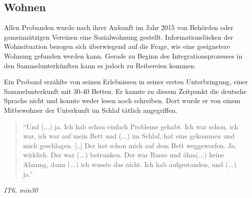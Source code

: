 \subsection{Wohnen}
Allen Probanden wurde nach ihrer Ankunft im Jahr 2015 von Behörden oder gemeinnützigen Vereinen eine Sozialwohnung gestellt. Informationslücken der Wohnsituation bezogen sich überwiegend auf die Frage, wie eine geeignetere Wohnung gefunden werden kann. Gerade zu Beginn des Integrationsprozesses in den Sammelunterkünften kann es jedoch zu Reibereien kommen. 

Ein Proband erzählte von seinen Erlebnissen in seiner ersten Unterbringung, einer Sammelunterkunft mit 30-40 Betten. Er kannte zu diesem Zeitpunkt die deutsche Sprache nicht und konnte weder lesen noch schreiben. Dort wurde er von einem Mitbewohner der Unterkunft im Schlaf tätlich angegriffen.

\begin{quote}
    ``Und (...) ja. Ich hab schon einfach Probleme gehabt. Ich war schon, ich war, ich war auf mein Bett und (...) im Schlaf, hat eine gekommen und mich geschlagen. [..] Der hat schon mich auf dem Bett weggeworfen. Ja, wirklich. Der war (...) betrunken. Der war Russe und ähm(...) keine Ahnung, dann (...) ich wusste das nicht. Ich hab aufgestanden, und (...) ja.''
\end{quote}
\centerline{\textit{IT6, min30}}


